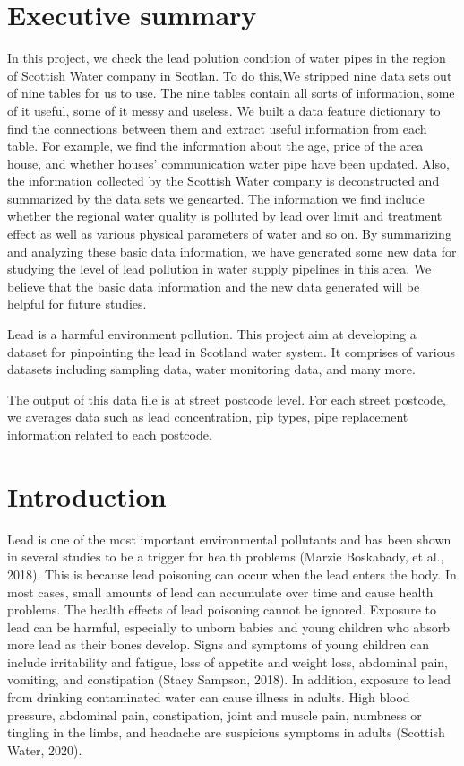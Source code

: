 \documentclass[11pt,twoside]{article}
\numberwithin{Theorem}{section}
\numberwithin{Definition}{section}
\numberwithin{Lemma}{section}
\numberwithin{Algorithm}{section}
\numberwithin{equation}{section}
\begin{document}
\cleardoublepage

\setcounter{page}{1}


\clearpage

\section*{Executive summary}
In this project, we check the lead polution condtion of water pipes in the region of Scottish Water company in Scotlan. To do this,We stripped nine data sets out of nine tables for us to use. The nine tables contain all sorts of information, some of it useful, some of it messy and useless. We built a data feature dictionary to find the connections between them and extract useful information from each table. For example, we find the information about the age, price of the area house, and whether houses' communication water pipe have been updated. Also, the information collected by the Scottish Water company is deconstructed and summarized by the data sets we genearted. The information we find include whether the regional water quality is polluted by lead over limit and treatment effect as well as various physical parameters of water and so on. By summarizing and analyzing these basic data information, we have generated some new data for studying the level of lead pollution in water supply pipelines in this area. We believe that the basic data information and the new data generated will be helpful for future studies.

\label{sec.summary}
Lead is a harmful environment pollution.
This project aim at developing a dataset for pinpointing
the lead in Scotland water system.
It comprises of various datasets including sampling data,
water monitoring data, and many more.

The output of this data file is at street postcode level.
For each street postcode,
we averages data such as lead concentration, pip types,
pipe replacement information related to each postcode.

\clearpage

\section{Introduction}
\label{sec.intro}
Lead is one of the most important environmental pollutants and has been shown in several studies to be a trigger for health problems (Marzie Boskabady, et al., 2018). This is because lead poisoning can occur when the lead enters the body. In most cases, small amounts of lead can accumulate over time and cause health problems. The health effects of lead poisoning cannot be ignored. Exposure to lead can be harmful, especially to unborn babies and young children who absorb more lead as their bones develop. Signs and symptoms of young children can include irritability and fatigue, loss of appetite and weight loss, abdominal pain, vomiting, and constipation (Stacy Sampson, 2018). In addition, exposure to lead from drinking contaminated water can cause illness in adults. High blood pressure, abdominal pain, constipation, joint and muscle pain, numbness or tingling in the limbs, and headache are suspicious symptoms in adults (Scottish Water, 2020).
\end{document}
